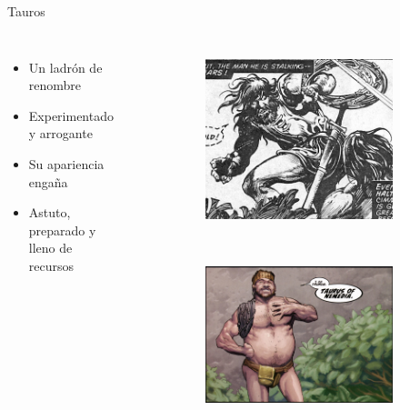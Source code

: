 \begin{frame}{Tauros}
\begin{columns}
\begin{itemize}
 \item Un ladrón de renombre
 \item Experimentado y arrogante
 \item Su apariencia engaña
 \item Astuto, preparado y lleno de recursos
\end{itemize}
\begin{figure}[htp]
 \centering
 \begin{subfigure}[b]{0.35\textwidth}
   \includegraphics[width=\textwidth]{img/tauros/TSSC}
 \end{subfigure}
~
 \begin{subfigure}[b]{0.3\textwidth}
   \includegraphics[width=\textwidth]{img/tauros/DH}

\end{subfigure}
\end{figure}
\end{columns}
\end{frame}
